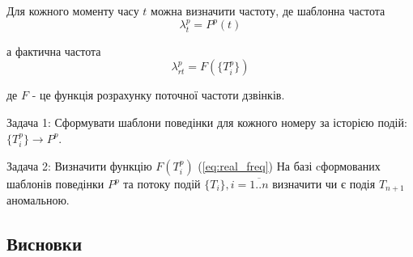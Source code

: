   Для кожного моменту часу $t$ можна визначити частоту, де шаблонна частота 
\begin{equation}\label{eq:pattern_freq} \lambda_t^p = P^p(t) \end{equation}

  а фактична частота
 \begin{equation}\label{eq:real_freq} \lambda_{rt}^p = F(\{T_i^p\}) \end{equation}
 \begin{ESKDexplanation}
    \item де $F$ - це функція розрахунку поточної частоти дзвінків.
  \end{ESKDexplanation}

  Задача 1: Сформувати шаблони поведінки для кожного номеру за історією подій: $\{T_i^{p}\} \rightarrow P^{p}$.

  Задача 2: Визначити функцію $F({T_i^p})$ (\ref{eq:real_freq}) На базі cформованих шаблонів поведінки $P^{p}$ та потоку подій $\{T_i\}, i = \overline{1..n}$ визначити чи є подія $T_{n+1}$ аномальною.

\newpage
\subsection*{Висновки}
    \TBD


